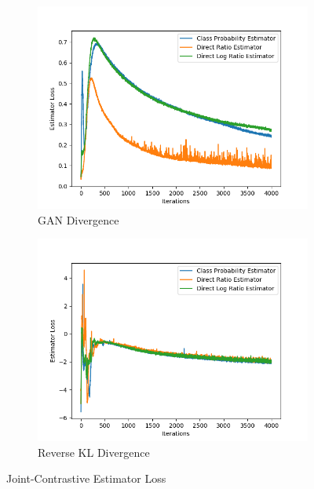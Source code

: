 \documentclass[honours,12pt]{unswthesis}
\numberwithin{equation}{section}
\theoremstyle{definition}
\begin{document}
\begin{figure}
\begin{subfigure}{0.49\textwidth}
\includegraphics[width=\linewidth]{part2estimatorlosses/JCADVvsJCADVexpvsJCADVgudlog.png}
\caption{GAN Divergence}
\end{subfigure}
\begin{subfigure}{0.49\textwidth}
\includegraphics[width=\linewidth]{part2estimatorlosses/JCKLDvsJCKLexpvsJCKLgudlog.png}
\caption{Reverse KL Divergence}
\end{subfigure}
\caption{Joint-Contrastive Estimator Loss}
\end{figure}
\end{document}
